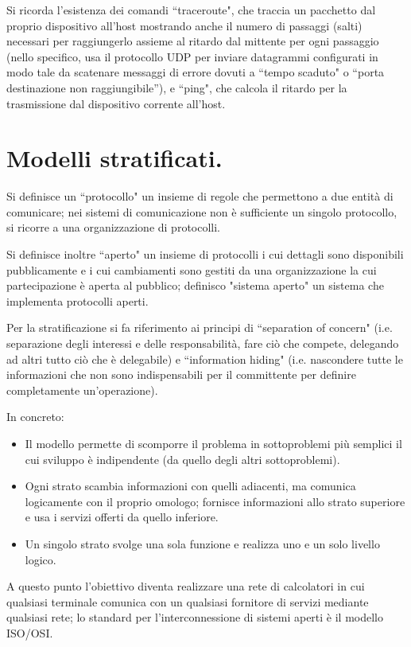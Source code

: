 \documentclass[11pt, italian, openany]{book}
\begin{document}
\begin{sloppypar}
Si ricorda l'esistenza dei comandi ``traceroute", che traccia un pacchetto dal proprio dispositivo all'host mostrando anche il numero di passaggi
(salti) necessari per raggiungerlo assieme al ritardo dal mittente per ogni passaggio (nello specifico, usa il protocollo UDP per inviare datagrammi
configurati in modo tale da scatenare messaggi di errore dovuti a ``tempo scaduto" o ``porta destinazione non raggiungibile''),
e ``ping", che calcola il ritardo per la trasmissione dal dispositivo corrente all'host.

\section{Modelli stratificati.}
Si definisce un ``protocollo" un insieme di regole che permettono a due entit\`a di comunicare; nei sistemi di comunicazione non \`e
sufficiente un singolo protocollo, si ricorre a una organizzazione di protocolli.

Si definisce inoltre ``aperto" un insieme di protocolli i cui dettagli sono disponibili pubblicamente e i cui cambiamenti sono gestiti da una
organizzazione la cui partecipazione \`e aperta al pubblico; definisco "sistema aperto" un sistema che implementa protocolli aperti.

Per la stratificazione si fa riferimento ai principi di ``separation of concern" (i.e. separazione degli interessi e delle responsabilit\`a, fare
ci\`o che compete, delegando ad altri tutto ci\`o che \`e delegabile) e ``information hiding" (i.e. nascondere tutte le informazioni che non sono
indispensabili per il committente per definire completamente un'operazione).

In concreto:
\begin{itemize}[topsep=0pt, itemsep=0pt, parsep=0pt]
	\item Il modello permette di scomporre il problema in sottoproblemi pi\`u semplici il cui sviluppo \`e indipendente (da quello degli altri
	sottoproblemi).
	\item Ogni strato scambia informazioni con quelli adiacenti, ma comunica logicamente con il proprio omologo; fornisce informazioni allo strato
	superiore e usa i servizi offerti da quello inferiore.
	\item Un singolo strato svolge una sola funzione e realizza uno e un solo livello logico.
\end{itemize}

A questo punto l'obiettivo diventa realizzare una rete di calcolatori in cui qualsiasi terminale comunica con un qualsiasi fornitore di servizi
mediante qualsiasi rete; lo standard per l'interconnessione di sistemi aperti \`e il modello ISO/OSI.


\end{sloppypar}
\end{document}
